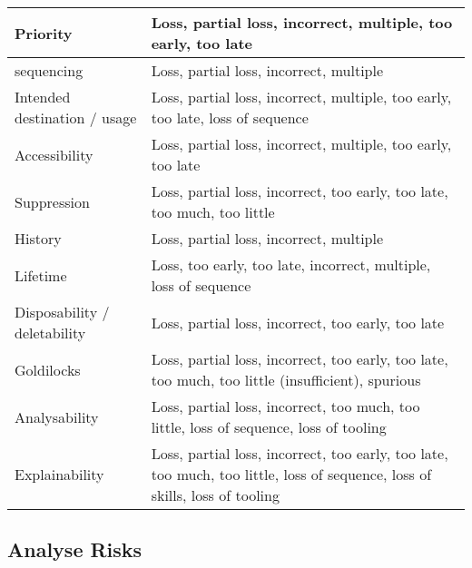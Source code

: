 \begin{longtable}{|L{}|L{}|}
  {Priority} & {Loss, partial loss, incorrect, multiple, too early, too late}\\\hline
  {\Gls{sequencing}} & {Loss, partial loss, incorrect, multiple}\\\hline
  {Intended destination / usage} & {Loss, partial loss, incorrect, multiple, too early, too late, loss of sequence}\\\hline
  {Accessibility} & {Loss, partial loss, incorrect, multiple, too early, too late}\\\hline
  {Suppression} & {Loss, partial loss, incorrect, too early, too late, too much, too little}\\\hline
  {History} & {Loss, partial loss, incorrect, multiple}\\\hline
  {Lifetime} & {Loss, too early, too late, incorrect, multiple, loss of sequence}\\\hline
  {Disposability / deletability} & {Loss, partial loss, incorrect, too early, too late}\\\hline
  {Goldilocks} & {Loss, partial loss, incorrect, too early, too late, too much,
    too little (insufficient), spurious}\\\hline
  {Analysability} & {Loss, partial loss, incorrect, too much, too little, loss of sequence, loss of tooling}\\\hline
  {Explainability} & {Loss, partial loss, incorrect, too early, too late, too much, too little, loss of sequence, loss of skills, loss of tooling}\\\hline
\end{longtable}

\clearpage
\subsection{Analyse Risks}
